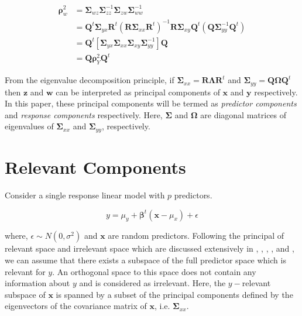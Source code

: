 \documentclass[num-refs]{wiley-article}
\begin{document}
\begin{description}
\[  \begin{aligned}
\boldsymbol{\rho}^2_w &= \boldsymbol{\Sigma}_{wz} 
\boldsymbol{\Sigma}_{zz}^{-1} \boldsymbol{\Sigma}_{zw} 
\boldsymbol{\Sigma}_{ww}^{-1} \\
  &=\mathbf{Q}^t
  \boldsymbol{\Sigma}_{yx}\mathbf{R}^t \left(\mathbf{R}\boldsymbol{\Sigma}_{xx}\mathbf{R}^t\right)^{-1}
  \mathbf{R}\boldsymbol{\Sigma}_{xy}\mathbf{Q}^t \left(\mathbf{Q} \boldsymbol{\Sigma}_{yy}^{-1} \mathbf{Q}^t\right) \nonumber \\
  &=\mathbf{Q}^t\left[\boldsymbol{\Sigma}_{yx}\boldsymbol{\Sigma}_{xx}\boldsymbol{\Sigma}_{xy}\boldsymbol{\Sigma}_{yy}^{-1}\right]\mathbf{Q} \\
  &= \mathbf{Q}\boldsymbol{\rho}_{Y}^2 \mathbf{Q}^t
  \end{aligned}
  \]
\end{description}

From the eigenvalue decomposition principle, if
\(\boldsymbol{\Sigma}_{xx} = \mathbf{R}\boldsymbol{\Lambda}\mathbf{R}^t\)
and
\(\boldsymbol{\Sigma}_{yy} = \mathbf{Q}\boldsymbol{\Omega}\mathbf{Q}^t\)
then \(\mathbf{z}\) and \(\mathbf{w}\) can be interpreted as principal
components of \(\mathbf{x}\) and \(\mathbf{y}\) respectively. In this
paper, these principal components will be termed as \emph{predictor
components} and \emph{response components} respectively. Here,
\(\boldsymbol{\Sigma}\) and \(\boldsymbol{\Omega}\) are diagonal
matrices of eigenvalues of \(\boldsymbol{\Sigma}_{xx}\) and
\(\boldsymbol{\Sigma}_{yy}\), respectively.

\section{Relevant Components}\label{relevant-components}

Consider a single response linear model with \(p\) predictors.

\[y = \mu_y + \boldsymbol{\beta}^t\left(\mathbf{x} - \mu_x\right) + \epsilon\]

where, \(\epsilon \sim N(0, \sigma^2)\) and \(\mathbf{x}\) are random
predictors. Following the principal of relevant space and irrelevant
space which are discussed extensively in \citet{helland1994comparison},
\citet{Helland_2000}, \citet{helland2012near},
\citet{cook2013envelopes}, \citet{saebo2015simrel} and
\citet{helland2017}, we can assume that there exists a subspace of the
full predictor space which is relevant for \(y\). An orthogonal space to
this space does not contain any information about \(y\) and is
considered as irrelevant. Here, the \(y-\)relevant subspace of
\(\mathbf{x}\) is spanned by a subset of the principal components
defined by the eigenvectors of the covariance matrix of \(\mathbf{x}\),
i.e. \(\boldsymbol{\Sigma}_{xx}\).
\end{document}
